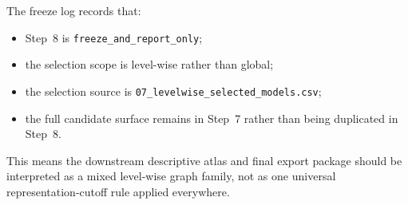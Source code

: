 The freeze log records that:
\begin{itemize}
    \item Step~8 is \texttt{freeze\_and\_report\_only};
    \item the selection scope is level-wise rather than global;
    \item the selection source is \texttt{07\_levelwise\_selected\_models.csv};
    \item the full candidate surface remains in Step~7 rather than being duplicated in Step~8.
\end{itemize}

This means the downstream descriptive atlas and final export package should be interpreted as a mixed level-wise graph family, not as one universal representation-cutoff rule applied everywhere.
